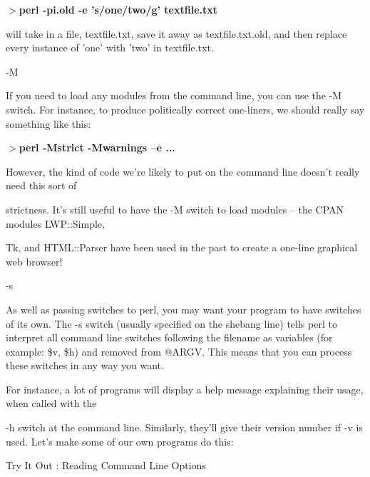 \documentclass[a4paper,11pt]{book}
\begin{document}
\noindent 

\noindent $>$\textbf{perl -pi.old -e 's/one/two/g' textfile.txt}

\noindent 

\noindent will take in a file, textfile.txt, save it away as textfile.txt.old, and then replace every instance of 'one' with 'two' in textfile.txt.

\noindent 

\noindent 

\noindent -M

\noindent 

\noindent If you need to load any modules from the command line, you can use the -M switch. For instance, to produce politically correct one-liners, we should really say something like this:

\noindent 

\noindent $>$\textbf{perl -Mstrict -Mwarnings --e ...}

\noindent 

\noindent 

\noindent However, the kind of code we're likely to put on the command line doesn't really need this sort of

\noindent strictness. It's still useful to have the -M switch to load modules -- the CPAN modules LWP::Simple,

\noindent Tk, and HTML::Parser have been used in the past to create a one-line graphical web browser!

\noindent 

\noindent 

\noindent -s

\noindent 

\noindent As well as passing switches to perl, you may want your program to have switches of its own. The -s switch (usually specified on the shebang line) tells perl to interpret all command line switches following the filename as variables (for example: \$v, \$h) and removed from @ARGV. This means that you can process these switches in any way you want.

\noindent 

\noindent For instance, a lot of programs will display a help message explaining their usage, when called with the

\noindent -h switch at the command line. Similarly, they'll give their version number if -v is used. Let's make some of our own programs do this:

\noindent 

\noindent Try It Out : Reading Command Line Options
\end{document}
